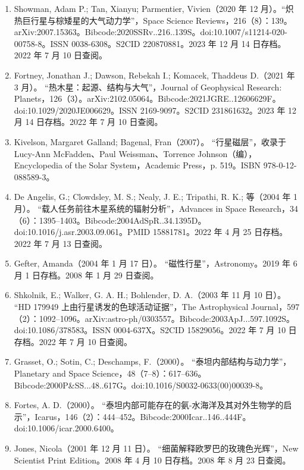 \begin{enumerate}
\begin{itemize}
\item “NASA 的史匹泽望远镜观测到奇异世界的昼夜差异”（新闻稿），NASA，2006 年 10 月 12 日。2017 年 7 月 13 日存档。2007 年 8 月 16 日查阅。
\end{itemize}
\item Showman, Adam P.; Tan, Xianyu; Parmentier, Vivien（2020 年 12 月）。“炽热巨行星与棕矮星的大气动力学”，Space Science Reviews，216（8）：139。arXiv:2007.15363。Bibcode:2020SSRv..216..139S。doi:10.1007/s11214-020-00758-8。ISSN 0038-6308。S2CID 220870881。2023 年 12 月 14 日存档。2022 年 7 月 10 日查阅。
\item Fortney, Jonathan J.; Dawson, Rebekah I.; Komacek, Thaddeus D.（2021 年 3 月）。 “热木星：起源、结构与大气”，Journal of Geophysical Research: Planets，126（3）。arXiv:2102.05064。Bibcode:2021JGRE..12606629F。doi:10.1029/2020JE006629。ISSN 2169-9097。S2CID 231861632。2023 年 12 月 14 日存档。2022 年 7 月 10 日查阅。
\item Kivelson, Margaret Galland; Bagenal, Fran（2007）。 “行星磁层”，收录于 Lucy-Ann McFadden、Paul Weissman、Torrence Johnson（编），Encyclopedia of the Solar System，Academic Press，p. 519。ISBN 978-0-12-088589-3。
\item De Angelis, G.; Clowdsley, M. S.; Nealy, J. E.; Tripathi, R. K.; 等（2004 年 1 月）。 “载人任务前往木星系统的辐射分析”，Advances in Space Research，34（6）：1395–1403。Bibcode:2004AdSpR..34.1395D。doi:10.1016/j.asr.2003.09.061。PMID 15881781。2022 年 4 月 25 日存档。2022 年 7 月 13 日查阅。
\item Gefter, Amanda（2004 年 1 月 17 日）。 “磁性行星”，Astronomy。2019 年 6 月 1 日存档。2008 年 1 月 29 日查阅。
\item Shkolnik, E.; Walker, G. A. H.; Bohlender, D. A.（2003 年 11 月 10 日）。 “HD 179949 上由行星诱发的色球活动证据”，The Astrophysical Journal，597（2）：1092–1096。arXiv:astro-ph/0303557。Bibcode:2003ApJ...597.1092S。doi:10.1086/378583。ISSN 0004-637X。S2CID 15829056。2022 年 7 月 10 日存档。2022 年 7 月 10 日查阅。
\item Grasset, O.; Sotin, C.; Deschamps, F.（2000）。 “泰坦内部结构与动力学”，Planetary and Space Science，48（7–8）：617–636。Bibcode:2000P&SS...48..617G。doi:10.1016/S0032-0633(00)00039-8。
\item Fortes, A. D.（2000）。 “泰坦内部可能存在的氨-水海洋及其对外生物学的启示”，Icarus，146（2）：444–452。Bibcode:2000Icar..146..444F。doi:10.1006/icar.2000.6400。
\item Jones, Nicola（2001 年 12 月 11 日）。 “细菌解释欧罗巴的玫瑰色光辉”，New Scientist Print Edition。2008 年 4 月 10 日存档。2008 年 8 月 23 日查阅。

\end{enumerate}
